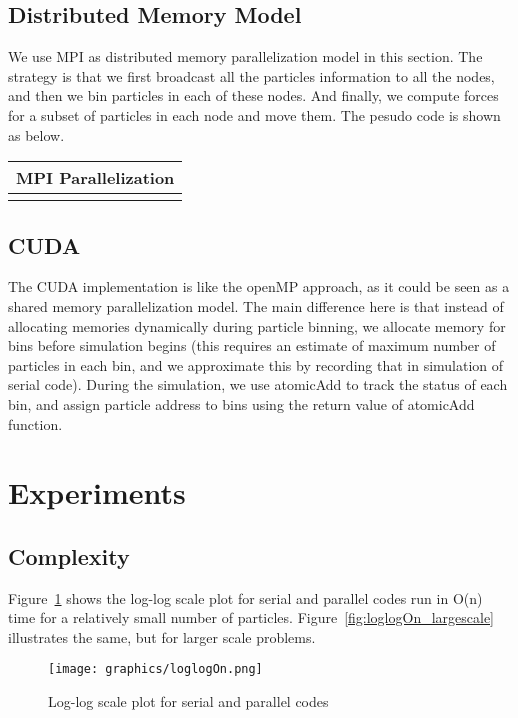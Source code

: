 \documentclass[11pt]{article}
\begin{document}
\subsection{Distributed Memory Model}
We use MPI \cite{mpi} as distributed memory parallelization model in this section. The strategy is that we first broadcast
all the particles information to all the nodes, and then we bin particles in each of these nodes. And finally, we 
compute forces for a subset of particles in each node and move them. The pesudo code is shown as below.

\begin{table}[htb]
  \centering
  \begin{tabular}{l}
    \hline
      MPI Parallelization\\
    \hline
      \\
    \hline
  \end{tabular}
  \label{tab:mpi_naive}
\end{table}

\subsection{CUDA}
The CUDA implementation is like the openMP approach, as it could be seen as a shared memory parallelization model.
The main difference here is that instead of allocating memories dynamically during particle binning, we allocate
memory for bins before simulation begins (this requires an estimate of maximum number of particles in each bin, and
we approximate this by recording that in simulation of serial code). During the simulation, we use atomicAdd to 
track the status of each bin, and assign particle address to bins using the return value of atomicAdd function.

\section{Experiments}
\subsection{Complexity}
Figure~\ref{fig:loglogOn} shows the log-log scale plot for serial and parallel codes run in O(n) time for a relatively small number of particles. Figure~\ref{fig:loglogOn_largescale} illustrates the same, but for larger scale problems.

\begin{figure}[htb]
  \centering
  \texttt{[image: graphics/loglogOn.png]}
  \caption{Log-log scale plot for serial and parallel codes}
  \label{fig:loglogOn}
\end{figure}
\end{document}
